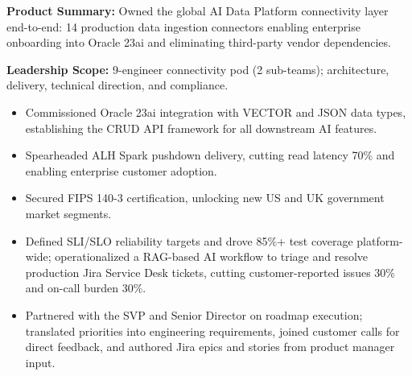 \textbf{Product Summary:} Owned the global AI Data Platform connectivity layer end-to-end: 14 production data ingestion connectors enabling enterprise onboarding into Oracle 23ai and eliminating third-party vendor dependencies.\par
\textbf{Leadership Scope:} 9-engineer connectivity pod (2 sub-teams); architecture, delivery, technical direction, and compliance.\par
{}
\begin{itemize}
\item Commissioned Oracle 23ai integration with VECTOR and JSON data types, establishing the CRUD API framework for all downstream AI features.
\item Spearheaded ALH Spark pushdown delivery, cutting read latency 70\% and enabling enterprise customer adoption.
\item Secured FIPS 140-3 certification, unlocking new US and UK government market segments.
\item Defined SLI/SLO reliability targets and drove 85\%+ test coverage platform-wide; operationalized a RAG-based AI workflow to triage and resolve production Jira Service Desk tickets, cutting customer-reported issues 30\% and on-call burden 30\%.
\item Partnered with the SVP and Senior Director on roadmap execution; translated priorities into engineering requirements, joined customer calls for direct feedback, and authored Jira epics and stories from product manager input.
\end{itemize}
